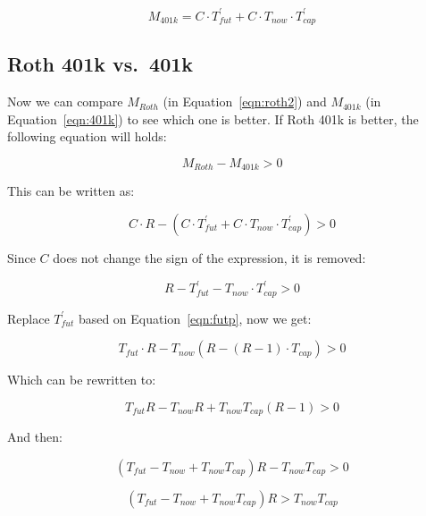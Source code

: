 \documentclass[twocolumn]{article}
\begin{document}
\begin{equation}
  M_{401k} = C \cdot T_{fut}^{\prime} + C \cdot T_{now} \cdot T_{cap}^{\prime} \label{eqn:401k}
\end{equation}

\subsection{Roth 401k vs.\ 401k}\label{sec:cmp}

Now we can compare $M_{Roth}$ (in Equation~\ref{eqn:roth2}) and $M_{401k}$ (in
Equation~\ref{eqn:401k}) to see which one is better. If Roth
401k is better, the following equation will holds:

\begin{equation}
  M_{Roth} - M_{401k} > 0
\end{equation}

This can be written as:

\begin{equation}
  C \cdot R - (C \cdot T_{fut}^{\prime} + C \cdot T_{now} \cdot T_{cap}^{\prime}) > 0 \label{eqn:cmp}
\end{equation}

Since $C$ does not change the sign of the expression, it is removed:

\begin{equation}
  R - T_{fut}^{\prime} - T_{now} \cdot T_{cap}^{\prime} > 0 \label{eqn:cmp2}
\end{equation}

Replace $T_{fut}^{\prime}$ based on Equation~\ref{eqn:futp}, now we get:

\begin{equation}
  T_{fut} \cdot R - T_{now} (R - (R - 1) \cdot T_{cap}) > 0
\end{equation}

Which can be rewritten to:

\begin{equation}
  T_{fut} R - T_{now} R + T_{now} T_{cap} (R - 1) > 0
\end{equation}

And then:

\begin{equation}
  (T_{fut} - T_{now} + T_{now} T_{cap})R - T_{now} T_{cap} > 0
\end{equation}

\begin{equation}
  (T_{fut} - T_{now} + T_{now} T_{cap})R > T_{now} T_{cap} \label{eqn:final}
\end{equation}
\end{document}
